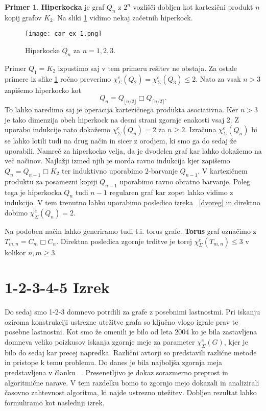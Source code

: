 \documentclass[12pt,a4paper,twoside]{article}
\theoremstyle{definition} %
\newtheorem{primer}[definicija]{Primer}
\theoremstyle{plain} %
\newcommand{\ec}{\chi_{\Sigma}^e}
\numberwithin{equation}{section}  %
\begin{document}
\begin{primer}
\textbf{Hiperkocka} je graf $Q_n$ z $2^n$ vozlišči dobljen kot kartezični produkt $n$ kopij grafov $K_2$. Na sliki \ref{hip} vidimo nekaj začetnih hiperkock.
 \begin{figure}[h!]
\caption{Hiperkocke $Q_n$ za $n=1,2,3$.}
\label{hip}
\centering
    \texttt{[image: car\_ex\_1.png]}
    \end{figure}
Primer $Q_1 = K_2$ izpustimo saj v tem primeru rešitev ne obstaja. Za ostale primere iz slike \ref{hip}  ročno preverimo $\ec(Q_2) = \ec(Q_3) \le 2.$ Nato za vsak $n > 3$ zapišemo hiperkocko kot
 $$Q_n = Q_{\lfloor n/2 \rfloor} \Box Q_{\lceil n/2 \rceil}.$$
 To lahko naredimo saj je operacija kartezičnega produkta asociativna. Ker $n > 3$ je tako dimenzija obeh hiperkock na desni strani zgornje enakosti vsaj $2$. Z uporabo indukcije nato dokažemo $\ec(Q_n) = 2$ za $ n \ge 2$. Izračuna $\ec(Q_n)$ bi se lahko lotili tudi na drug način in sicer z orodjem, ki smo ga do sedaj že uporabili. Namreč za hiperkocko velja, da je dvodelen graf kar lahko dokažemo na več načinov.  Najlažji izmed njih je morda ravno indukcija kjer zapišemo $Q_n = Q_{n-1} \Box K_2$ ter induktivno uporabimo $2$-barvanje $Q_{n-1}$. V kartezičnem produktu za posamezni kopiji $Q_{n-1}$ uporabimo ravno obratno barvanje. Poleg tega je hiperkocka $Q_n$ tudi $n-1$ regularen graf kar zopet lahko vidimo z indukcijo. V tem trenutno lahko uporabimo posledico izreka ~\ref{dvoreg} in direktno dobimo $\ec(Q_n) = 2$.

Na podoben način lahko generiramo tudi t.i. torus grafe. \textbf{Torus} graf označimo z $T_{m,n} = C_m \Box C_n$. Direktna posledica zgornje trditve je torej $\ec(T_{m,n}) \le 3$ v kolikor $n,m \ge 3$.
\end{primer}




 
 \section{1-2-3-4-5 Izrek}
 Do sedaj smo 1-2-3 domnevo potrdili za grafe z posebnimi lastnostmi. Pri iskanju oziroma konstrukciji ustrezne utežitve grafa so ključno vlogo igrale prav te posebne lastnostni.  Kot smo že omenili je bilo od leta 2004 ko je bila zastavljena domneva veliko poizkusov iskanja zgornje meje za parameter $\ec(G)$, kjer je bilo do sedaj kar precej napredka. Različni avtorji so predstavili različne metode in pristope k temu problemu. Do danes je bila najboljša zgornja meja predstavljena v članku ~\cite{proof12345}. Presenetljivo je dokaz sorazmerno preprost in algoritmične narave. V tem razdelku bomo to zgornjo mejo dokazali in analizirali časovno zahtevnost algoritma, ki najde ustrezno utežitev. Dobljen rezultat lahko formuliramo kot naslednji izrek.
\end{document}
